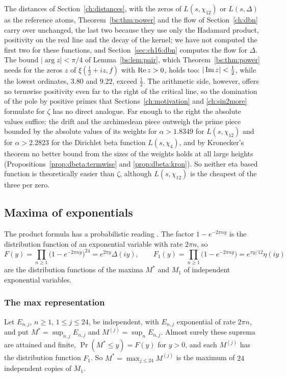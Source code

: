 The distances of Section~\ref{ch:distances}, with the zeros of $L(s,\chi_{12})$ or $L(s,\Delta)$ as the reference atoms, Theorem~\ref{bs:thm:power} and the flow of Section~\ref{ch:dbn} carry over unchanged, the last two because they use only the Hadamard product, positivity on the real line and the decay of the kernel; we have not computed the first two for these functions, and Section~\ref{sec:ch16:dbn} computes the flow for $\Delta$. The bound $|\arg z|<\pi/4$ of Lemma~\ref{bs:lem:pair}, which Theorem~\ref{bs:thm:power} needs for the zeros $z$ of $\xi(\frac12+iz,f)$ with $\operatorname{Re} z>0$, holds too: $|\operatorname{Im} z|<\frac12$, while the lowest ordinates, $3.80$ and $9.22$, exceed $\frac12$. The arithmetic side, however, offers no termwise positivity even far to the right of the critical line, so the domination of the pole by positive primes that Sections~\ref{ch:motivation} and \ref{ch:sin2more} formulate for $\zeta$ has no direct analogue. Far enough to the right the absolute values suffice: the drift and the archimedean piece outweigh the prime piece bounded by the absolute values of its weights for $\alpha>1.8349$ for $L(s,\chi_{12})$ and for $\alpha>2.2823$ for the Dirichlet beta function $L(s,\chi_4)$, and by Kronecker's theorem no better bound from the sizes of the weights holds at all large heights (Propositions~\ref{prop:dbeta:termwise} and \ref{prop:dbeta:kron}). So neither eta based function is theoretically easier than $\zeta$, although $L(s,\chi_{12})$ is the cheapest of the three per zero.

\subsection{Maxima of exponentials}\label{sec:ch16:max}

The product formula has a probabilistic reading \cite{P26max}. The factor $1-e^{-2\pi ny}$ is the distribution function of an exponential variable with rate $2\pi n$, so
\[
F(y)=\prod_{n\ge1}\big(1-e^{-2\pi ny}\big)^{24}=e^{2\pi y}\Delta(iy),\qquad F_1(y)=\prod_{n\ge1}\big(1-e^{-2\pi ny}\big)=e^{\pi y/12}\eta(iy)
\]
are the distribution functions of the maxima $M^*$ and $M_1$ of independent exponential variables.

\subsubsection{The max representation}\label{sec:maxexp:rep}

\begin{lemma}\label{lem:maxexp:max}
Let $E_{n,j}$, $n\ge1$, $1\le j\le24$, be independent, with $E_{n,j}$ exponential of rate $2\pi n$, and put $M^*=\sup_{n,j}E_{n,j}$ and $M^{(j)}=\sup_nE_{n,j}$. Almost surely these suprema are attained and finite, $\Pr(M^*\le y)=F(y)$ for $y>0$, and each $M^{(j)}$ has the distribution function $F_1$. So $M^*=\max_{j\le24}M^{(j)}$ is the maximum of $24$ independent copies of $M_1$.
\end{lemma}

